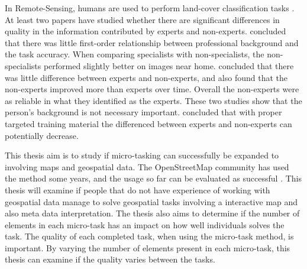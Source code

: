 In Remote-Sensing, humans are used to perform land-cover classification tasks \citep{Salk2016}. At least two papers have studied whether there are significant differences in quality in the information contributed by experts and non-experts.
\cite{Salk2016} concluded that there was little first-order relationship between professional background and the task accuracy.
When comparing specialists with non-specialists, the non-specialists performed slightly better on images near home. 
\cite{See2013} concluded that there was little difference between experts and non-experts, and also found that the non-experts improved more than experts over time. Overall the non-experts were as reliable in what they identified as the experts. These two studies show that the person's background is not necessary important. \cite{See2013} concluded that with proper targeted training material the differenced between experts and non-experts can potentially decrease.   

This thesis aim is to study if micro-tasking can successfully be expanded to involving maps and geospatial data. The OpenStreetMap community has used the method some years, and the usage so far can be evaluated as successful \citep{Erichsen2016}. This thesis will examine if people that do not have experience of working with geospatial data manage to solve geospatial tasks involving a interactive map and also meta data interpretation. The thesis also aims to determine if the number of elements in each micro-task has an impact on how well individuals solves the task. The quality of each completed task, when using the micro-task method, is important. By varying the number of elements present in each micro-task, this thesis can examine if the quality varies between the tasks. 

